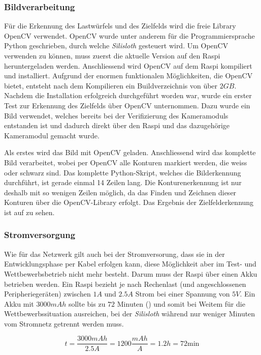 \subsubsection{Bildverarbeitung}

Für die Erkennung des Lastwürfels und des Zielfelds wird die freie Library OpenCV  verwendet. OpenCV wurde unter anderem für die Programmiersprache Python geschrieben, durch welche \textit{Silisloth} gesteuert wird. Um OpenCV verwenden zu können, muss zuerst die aktuelle Version auf den Raspi heruntergeladen werden. Anschliessend wird OpenCV auf dem Raspi kompiliert und installiert. Aufgrund der enormen funktionalen Möglichkeiten, die OpenCV bietet, entsteht nach dem Kompilieren ein Buildverzeichnis von über $2 GB$. Nachdem die Installation erfolgreich durchgeführt worden war, wurde ein erster Test zur Erkennung des Zielfelds über OpenCV unternommen. Dazu wurde ein Bild verwendet, welches bereits bei der Verifizierung des Kameramoduls entstanden ist und dadurch direkt über den Raspi und das dazugehörige Kameramodul gemacht wurde. 

Als erstes wird das Bild mit OpenCV geladen. Anschliessend wird das komplette Bild verarbeitet, wobei per OpenCV alle Konturen markiert werden, die weiss oder schwarz sind. Das komplette Python-Skript, welches die Bilderkennung durchführt, ist gerade einmal 14 Zeilen lang. Die Konturenerkennung ist nur deshalb mit so wenigen Zeilen möglich, da das Finden und Zeichnen dieser Konturen über die OpenCV-Library erfolgt. Das Ergebnis der Zielfelderkennung ist auf  zu sehen.

\subsubsection{Stromversorgung}
\label{sec:usv}

Wie für das Netzwerk gilt auch bei der Stromversorung, dass sie in der Entwicklungsphase per Kabel erfolgen kann, diese Möglichkeit aber im Test- und Wettbewerbsbetrieb nicht mehr besteht. Darum muss der Raspi über einen Akku betrieben werden. Ein Raspi bezieht je nach Rechenlast (und angeschlossenen Peripheriegeräten) zwischen $1A$ und $2.5A$ Strom bei einer Spannung von $5V$. Ein Akku mit $3000mAh$ sollte bis zu $72$ Minuten () und somit bei Weitem für die Wettbewerbssituation ausreichen, bei der \textit{Silisloth} während nur weniger Minuten vom Stromnetz getrennt werden muss.

\begin{equation}
    t = \frac{3000mAh}{2.5A} = 1200 \frac{mAh}{A} = 1.2h = 72\text{min}
    \label{eq:betriebsdauer}
\end{equation}

